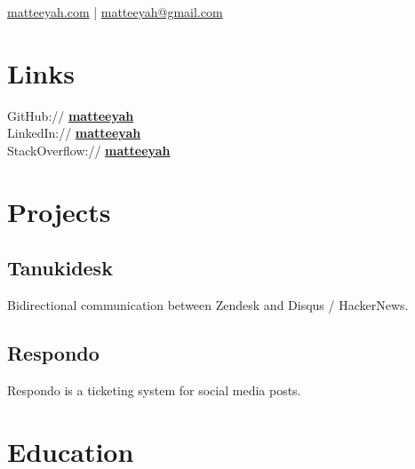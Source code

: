 \documentclass[]{matija-resume}
\begin{document}
%
%
\lastupdated

%
%
 {
\href{https://matteeyah.com}{matteeyah.com} |
\href{mailto:matteeyah@gmail.com}{matteeyah@gmail.com}
}

%
%

\begin{minipage}[t]{0.33\textwidth} 



\section{Links} 
GitHub:// \href{https://github.com/matteeyah}{\bf matteeyah} \\
LinkedIn://  \href{https://www.linkedin.com/in/matteeyah}{\bf matteeyah} \\
StackOverflow://  \href{https://stackoverflow.com/users/1139722/matteeyah}{\bf matteeyah}


\section{Projects}
\subsection{Tanukidesk}
Bidirectional communication between Zendesk and Disqus / HackerNews.
\sectionsep
\subsection{Respondo}
Respondo is a ticketing system for social media posts.
\sectionsep


\section{Education} 


\end{minipage}
\end{document}
